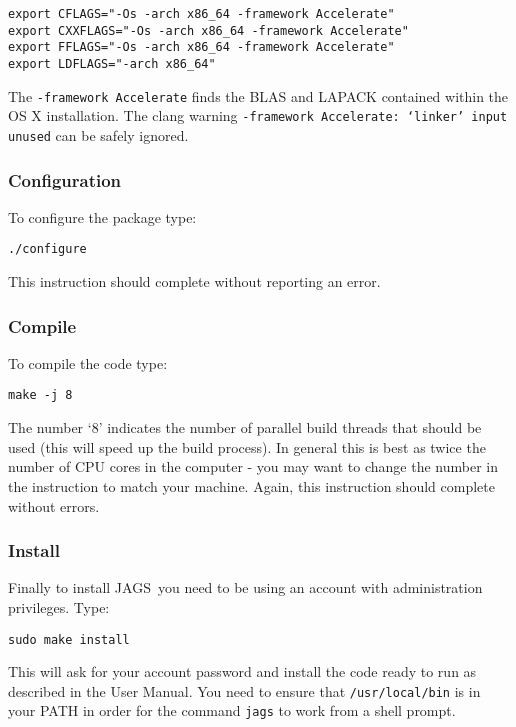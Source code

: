 \documentclass[11pt, a4paper, titlepage]{article}
\newcommand{\JAGS}{\textsf{JAGS}}
\begin{document}
\begin{verbatim}
export CFLAGS="-Os -arch x86_64 -framework Accelerate"
export CXXFLAGS="-Os -arch x86_64 -framework Accelerate"
export FFLAGS="-Os -arch x86_64 -framework Accelerate"
export LDFLAGS="-arch x86_64"
\end{verbatim}

The \texttt{-framework Accelerate} finds the BLAS and LAPACK 
contained within the OS X installation.  The clang warning
\texttt{-framework Accelerate: `linker' input unused} can
be safely ignored.

\subsubsection{Configuration}

To configure the package type:

\begin{verbatim}
./configure
\end{verbatim}

This instruction should complete without reporting an error.

\subsubsection{Compile}
\label{section:osxcompile}

To compile the code type: 

\begin{verbatim} 
make -j 8 
\end{verbatim} 

The number `8' indicates the number of parallel build threads that
should be used (this will speed up the build process).  In general this
is best as twice the number of CPU cores in the computer - you may want
to change the number in the instruction to match your machine. Again,
this instruction should complete without errors.

\subsubsection{Install}
\label{section:osxinstall}

Finally to install \JAGS\ you need to be using an account with
administration privileges.  Type: 

\begin{verbatim}
sudo make install
\end{verbatim} 

This will ask for your account password and install the code ready to 
run as described in the User Manual. You need to ensure that
\texttt{/usr/local/bin} is in your PATH in order for the command 
\texttt{jags} to work from a shell prompt.
\end{document}
